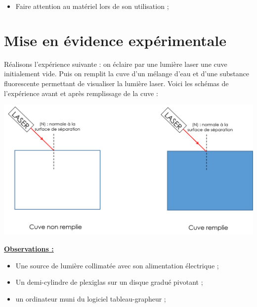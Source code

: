 \begin{tcolorbox}[colback=red!5!white,colframe=red!75!black,title= Consignes :]
\begin{itemize}
    \item Faire attention au matériel lors de son utilisation ;
\end{itemize}
\end{tcolorbox}

\section{Mise en évidence expérimentale}
\begin{tcolorbox}[colback=orange!5!white,colframe=orange!75!black,title= Expérience introductive :]
Réalisons l'expérience suivante : on éclaire par une lumière laser une cuve initialement vide. Puis on remplit la cuve d'un mélange d'eau et d'une substance fluorescente permettant de visualiser la lumière laser. Voici les schémas de l'expérience avant et après remplissage de la cuve :
\begin{center}
    \includegraphics[scale=0.4]{Images/TP/TP9/Experience_intro.png}
\end{center}
\textbf{\underline{Observations :}}

\end{tcolorbox}


\begin{mdframed}[style=autreexo]
\textbf{}
\begin{itemize}
    \item Une source de lumière collimatée avec son alimentation électrique ;
    \item Un demi-cylindre de plexiglas sur un disque gradué pivotant ;
    \item un ordinateur muni du logiciel tableau-grapheur ;
\end{itemize}
\end{mdframed}

